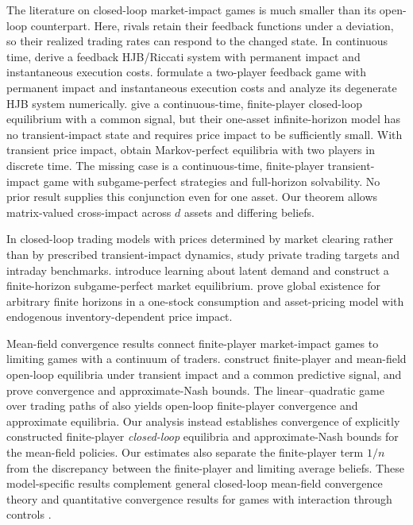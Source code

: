 \documentclass[12pt]{article}
\numberwithin{equation}{section}
\theoremstyle{definition}
\begin{document}
The literature on closed-loop market-impact games is much smaller than its
open-loop counterpart. Here, rivals retain their feedback
functions under a deviation, so their realized trading rates can respond to
the changed state. In continuous time, \citet{carlin2007} derive a feedback
HJB/Riccati system with permanent impact and instantaneous execution costs.
\citet{CarmonaYang2008PredatoryTrading} formulate a two-player feedback
game with permanent impact and instantaneous execution costs and analyze its
degenerate HJB system numerically. \citet{micheli2023} give a
continuous-time, finite-player closed-loop equilibrium with a common signal,
but their one-asset infinite-horizon model has no transient-impact state and
requires price impact to be sufficiently small. With transient price impact,
\citet{Ohnishi02102020,Ohnishi03072024} obtain Markov-perfect equilibria with
two players in discrete time. The missing case is a continuous-time,
finite-player transient-impact game with
subgame-perfect strategies and full-horizon solvability.  No prior result
supplies this conjunction even for one asset. Our theorem allows matrix-valued
cross-impact across \(d\) assets and differing beliefs.

In closed-loop trading models with prices determined by market clearing rather
than by prescribed transient-impact dynamics,
\citet{ChoiLarsenSeppi2019,ChoiLarsenSeppi2021Benchmarks}
study private trading targets and intraday benchmarks.
\citet{ChenChoiLarsenSeppi2022} introduce learning about latent demand and
construct a finite-horizon subgame-perfect market equilibrium.
\citet{ChenChoiLarsenSeppi2023} prove global existence for arbitrary finite
horizons in a one-stock consumption and asset-pricing model with endogenous
inventory-dependent price impact.

Mean-field convergence results connect finite-player market-impact games
to limiting games with a continuum of traders.
\citet{NeumanVoss2023} construct finite-player and
mean-field open-loop equilibria under transient impact and a common predictive
signal, and prove convergence and approximate-Nash bounds.  The
linear--quadratic game over trading paths of
\citet{AbiJaberNeumanVoss2023} also yields open-loop finite-player convergence
and approximate equilibria. Our analysis instead establishes convergence of
explicitly constructed finite-player \emph{closed-loop} equilibria and approximate-Nash
bounds for the mean-field policies. Our estimates also separate the finite-player
term \(1/n\) from the discrepancy between the finite-player and limiting
average beliefs. These model-specific results complement general closed-loop
mean-field convergence theory \citep{Lacker2020ClosedLoop,LackerLeFlem2023}
and quantitative convergence results for games with interaction through
controls \citep{LauriereTangpi2022}.
\end{document}
